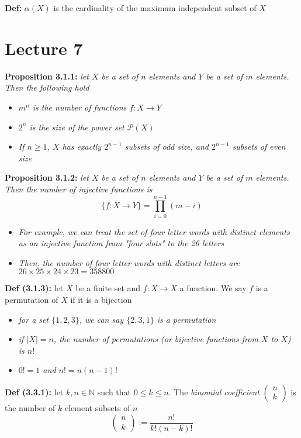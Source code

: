 \documentclass[12pt]{article}
\begin{document}
\textbf{Def: }$\alpha(X)$ is the cardinality of the maximum independent subset of $X$ 
\clearpage

\section{Lecture 7}
\textbf{Proposition 3.1.1: }\emph{let $X$ be a set of $n$ elements and $Y$ be a set of $m$ elements. Then the following hold}
\begin{itemize}
    \item \emph{$m^n$ is the number of functions $f: X \rightarrow Y$} 
    \item \emph{$2^n$ is the size of the power set $\mathcal{P}(X)$}
    \item \emph{If $n \geq 1$, $X$ has exactly $2^{n - 1}$ subsets of odd size, and $2^{n - 1}$ subsets of even size}
\end{itemize}

\textbf{Proposition 3.1.2: }\emph{let $X$ be a set of $n$ elements and $Y$ be a set of $m$ elements. Then the number of injective functions is}
$$\{ f: X \rightarrow Y \} = \prod_{i = 0}^{n - 1}(m - i)$$
\begin{itemize}
    \item \emph{For example, we can treat the set of four letter words with distinct elements as an injective function from "four slots" to the 26 letters}
    \item \emph{Then, the number of four letter words with distinct letters are $26 \times 25 \times 24 \times 23 = 358800$}
\end{itemize}

\textbf{Def (3.1.3): }let $X$ be a finite set and $f: X \rightarrow X$ a function. We say $f$ is a permutation of $X$ if it is a bijection
\begin{itemize}
    \item \emph{for a set $\{ 1, 2, 3 \}$, we can say $\{ 2, 3, 1 \}$ is a permutation}
    \item \emph{if $|X| = n$, the number of permutations (or bijective functions from $X$ to $X$) is $n!$}
    \item \emph{$0! = 1$ and $n! = n (n - 1)!$}
\end{itemize}

\textbf{Def (3.3.1): }let $k, n \in \mathbb{N}$ such that $0 \leq k \leq n$. The \emph{binomial coefficient} 
$\begin{pmatrix}
n \\ k
\end{pmatrix}$ is the number of $k$ element subsets of $n$
$$\begin{pmatrix} n \\ k \end{pmatrix} := \frac{n!}{k!(n - k)!}$$
\end{document}
